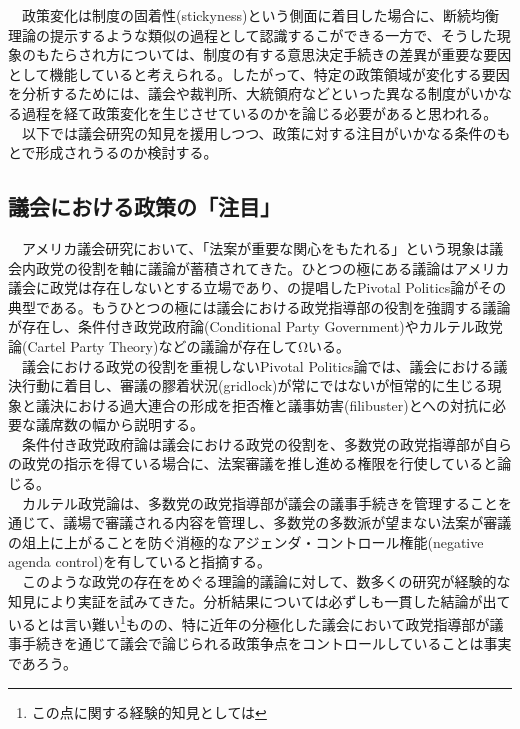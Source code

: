 　政策変化は制度の固着性(stickyness)という側面に着目した場合に、断続均衡理論の提示するような類似の過程として認識するこができる一方で、そうした現象のもたらされ方については、制度の有する意思決定手続きの差異が重要な要因として機能していると考えられる。したがって、特定の政策領域が変化する要因を分析するためには、議会や裁判所、大統領府などといった異なる制度がいかなる過程を経て政策変化を生じさせているのかを論じる必要があると思われる。\\
　以下では議会研究の知見を援用しつつ、政策に対する注目がいかなる条件のもとで形成されうるのか検討する。\\

\subsection{議会における政策の「注目」}
　アメリカ議会研究において、「法案が重要な関心をもたれる」という現象は議会内政党の役割を軸に議論が蓄積されてきた。ひとつの極にある議論はアメリカ議会に政党は存在しないとする立場であり、\citet*{Krehbiel2010-ob}の提唱したPivotal Politics論がその典型である。もうひとつの極には議会における政党指導部の役割を強調する議論が存在し、条件付き政党政府論(Conditional Party Government)\citep*{Rohde1991-da, Aldrich1995-xf}やカルテル政党論(Cartel Party Theory)\citep*{Cox2005-pn,Cox2007-xq}などの議論が存在してΩいる。\\
　議会における政党の役割を重視しないPivotal Politics論では、議会における議決行動に着目し、審議の膠着状況(gridlock)が常にではないが恒常的に生じる現象と議決における過大連合の形成を拒否権と議事妨害(filibuster)とへの対抗に必要な議席数の幅から説明する。\citep*{Krehbiel2010-ob}\\
　条件付き政党政府論は議会における政党の役割を、多数党の政党指導部が自らの政党の指示を得ている場合に、法案審議を推し進める権限を行使していると論じる。\\
　カルテル政党論は、多数党の政党指導部が議会の議事手続きを管理することを通じて、議場で審議される内容を管理し、多数党の多数派が望まない法案が審議の俎上に上がることを防ぐ消極的なアジェンダ・コントロール権能(negative agenda control)を有していると指摘する。\citep*{Cox2005-pn}\\
　このような政党の存在をめぐる理論的議論に対して、数多くの研究が経験的な知見により実証を試みてきた。分析結果については必ずしも一貫した結論が出ているとは言い難い\footnote{この点に関する経験的知見としては}ものの、特に近年の分極化した議会において政党指導部が議事手続きを通じて議会で論じられる政策争点をコントロールしていることは事実であろう。\citep*{Sinclair1997-jm, Sinclair2016-kh,Rosenthal2008-xb, Peters2010-ve}\\

